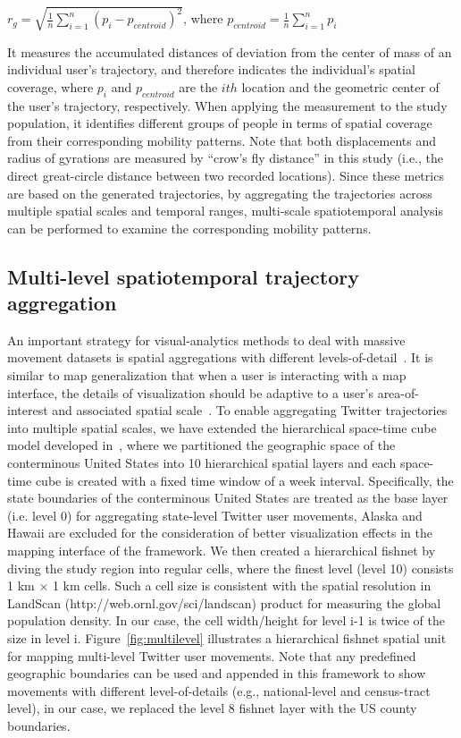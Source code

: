 \documentclass[ijgi,article,accept,moreauthors,pdftex,10pt,a4paper]{mdpi}
\theoremstyle{mdpi}
\newcounter{ex}
\newcounter{re}
\theoremstyle{mdpidefinition}
\begin{document}
$r_{g} = \sqrt{\frac{1}{n}\sum_{i=1}^{n}(p_{i} - p_{centroid})^{2}}$, where $p_{centroid} = \frac{1}{n}\sum_{i=1}^{n}p_{i}$
\newline

\noindent It measures the accumulated distances of deviation from the center of mass of an individual user's trajectory, and therefore indicates the individual's spatial coverage, where $p_{i}$ and $p_{centroid}$ are the $ith$ location and the geometric center of the user's trajectory, respectively.
When applying the measurement to the study population, it identifies different groups of people in terms of spatial coverage from their corresponding mobility patterns. Note that both displacements and radius of gyrations are measured by ``crow's fly distance'' in this study (i.e., the direct great-circle distance between two recorded locations).
Since these metrics are based on the generated trajectories, by aggregating the trajectories across multiple spatial scales and temporal ranges, multi-scale spatiotemporal analysis can be performed  to examine the corresponding mobility patterns. 

\subsection{Multi-level spatiotemporal trajectory aggregation}
An important strategy for visual-analytics methods to deal with massive movement datasets is spatial aggregations with different levels-of-detail~\cite{andrienko2007designing,andrienko2007visual}.
It is similar to map generalization that when a user is interacting with a map interface, the details of visualization should be adaptive to a user's area-of-interest and associated spatial scale~\cite{buttenfield1991map}.
To enable aggregating Twitter trajectories into multiple spatial scales, we have extended the hierarchical space-time cube model developed in~\cite{cao2014scalable}, where we partitioned the geographic space of the conterminous United States into 10 hierarchical spatial layers and each space-time cube is created with a fixed time window of a week interval. 
Specifically, the state boundaries of the conterminous United States are treated as the base layer (i.e. level 0) for aggregating state-level Twitter user movements, Alaska and Hawaii are excluded for the consideration of better visualization effects in the mapping interface of the framework.
We then created a hierarchical fishnet by diving the study region into regular cells, where the finest level (level 10) consists 1 km $\times$ 1 km cells.
Such a cell size is consistent with the spatial resolution in LandScan (http://web.ornl.gov/sci/landscan) product for measuring the global population density.
In our case, the cell width/height for level i-1 is twice of the size in level i.
Figure~\ref{fig:multilevel} illustrates a hierarchical fishnet spatial unit for mapping multi-level Twitter user movements.
Note that any predefined geographic boundaries can be used and appended in this framework to show movements with different level-of-details (e.g., national-level and census-tract level), in our case, we replaced the level 8 fishnet layer with the US county boundaries.
\end{document}
